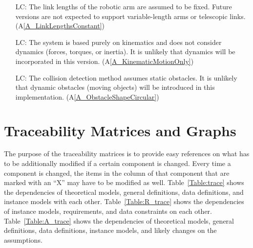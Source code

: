 \documentclass[12pt]{article}
\newcommand{\aref}[1]{A\ref{#1}}
\newcommand{\iref}[1]{IM\ref{#1}}
\newcounter{lcnum} %
\providecommand{\DIFdelbegin}{} %
\newcommand{\DIFscaledelfig}{0.5}
\newlength{\DIFdelgraphicswidth} %
\newlength{\DIFdelgraphicsheight} %
\newcommand{\DIFdelincludegraphics}[2][]{%
\sbox{\DIFdelgraphicsbox}{\DIFOincludegraphics[#1]{#2}}%
\settoboxwidth{\DIFdelgraphicswidth}{\DIFdelgraphicsbox} %
\settoboxtotalheight{\DIFdelgraphicsheight}{\DIFdelgraphicsbox} %
\scalebox{\DIFscaledelfig}{%
\parbox[b]{\DIFdelgraphicswidth}{\usebox{\DIFdelgraphicsbox}\\[-\baselineskip] \rule{\DIFdelgraphicswidth}{0em}}\llap{\resizebox{\DIFdelgraphicswidth}{\DIFdelgraphicsheight}{%
\setlength{\unitlength}{\DIFdelgraphicswidth}%
\begin{picture}(1,1)%
\thicklines\linethickness{2pt} %
{\color[rgb]{1,0,0}\put(0,0){\framebox(1,1){}}}%
{\color[rgb]{1,0,0}\put(0,0){\line( 1,1){1}}}%
{\color[rgb]{1,0,0}\put(0,1){\line(1,-1){1}}}%
\end{picture}%
}\hspace*{3pt}}} %
} %
\DeclareRobustCommand{\DIFdelbegin}{\DIFOdelbegin \let\includegraphics\DIFdelincludegraphics} %
\begin{document}
  \noindent \begin{itemize}

  \item[LC\refstepcounter{lcnum}\thelcnum\label{LC_FixedLinkLengths}:]  
  The link lengths of the robotic arm are assumed to be fixed. Future versions are not expected to support variable-length arms or telescopic links. (\aref{A_LinkLengthsConstant})

  
  \item[LC\refstepcounter{lcnum}\thelcnum\label{LC_NoDynamics}:]  
  The system is based purely on kinematics and does not consider dynamics (forces, torques, or inertia). It is unlikely that dynamics will be incorporated in this version. (\aref{A_KinematicMotionOnly})

  \item[LC\refstepcounter{lcnum}\thelcnum\label{LC_FixedCollisionDetection}:]  
  The collision detection method assumes static obstacles. It is unlikely that dynamic obstacles (moving objects) will be introduced in this implementation. (\aref{A_ObstacleShapeCircular})

  \end{itemize}


\section{Traceability Matrices and Graphs}

The purpose of the traceability matrices is to provide easy references on what
has to be additionally modified if a certain component is changed.  Every time a
component is changed, the items in the column of that component that are marked
with an ``X'' may have to be modified as well.  Table~\ref{Table:trace} shows the
dependencies of theoretical models, general definitions, data definitions, and
instance models with each other. Table~\ref{Table:R_trace} shows the
dependencies of instance models, requirements, and data constraints on each
other. Table~\ref{Table:A_trace} shows the dependencies of theoretical models,
general definitions, data definitions, instance models, and likely changes on
the assumptions.



\DIFdelbegin %
\end{document}
